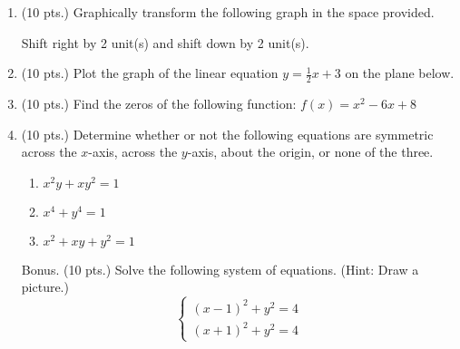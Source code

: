 \documentclass{article}
\begin{document}
\begin{enumerate}
\item (10 pts.) Graphically transform the following graph in the space provided.

\begin{center}
Shift right by 2 unit(s) and shift down by 2 unit(s).
\end{center}

\begin{center}
\MiniGraph[gadget=elliptic4]
\end{center}

   \vspace{1cm}

\newpage

\item (10 pts.) Plot the graph of the linear equation $y = \frac{1}{2} x + 3$ on the plane below.\begin{center}
\CartesianPlane[h=7,w=7,axes=yes]
\end{center}

  

\item (10 pts.) Find the zeros of the following function: $f(x) = x^2 - 6x + 8$ \vspace{3cm}

\item (10 pts.) Determine whether or not the following equations are symmetric across the $x$-axis, across the $y$-axis, about the origin, or none of the three.

\begin{enumerate}
\item $x^2 y + x y^2 = 1$ \vspace{3cm}
\item $x^4 + y^4 = 1$ \vspace{3cm}
\item $x^2 + xy + y^2 = 1$ \vspace{3cm}
\end{enumerate}

 \vspace{1cm}

\newpage

\item[Bonus.] (10 pts.) Solve the following system of equations. (Hint: Draw a picture.) \[ \left\{ \begin{array}{l} (x-1)^2 + y^2 = 4 \\ (x+1)^2 + y^2 = 4 \end{array} \right. \]

\end{enumerate}
\end{document}
